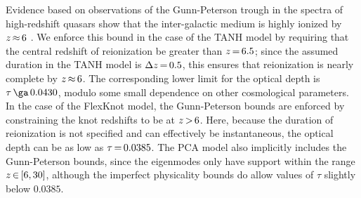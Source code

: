 \documentclass[longauth,traditabstract]{aa}
\def\,{\thinspace}
\begin{document}
Evidence based on observations of the Gunn-Peterson trough in the spectra of
high-redshift quasars show that  the inter-galactic medium is highly ionized by
$z\,{\approx}\,6$ \citep[see e.g.,][]{bouwens2015}. We enforce this bound in the
case of the TANH model by requiring that the central redshift of reionization be
greater than $z\,{=}\,6.5$; since the assumed duration in the TANH model is
$\Delta z\,{=}\,0.5$, this ensures that reionization is nearly complete by
$z\,{\approx}\,6$. The corresponding lower limit for the optical depth is
$\tau\,{\ga}\,0.0430$, modulo some small dependence on other cosmological
parameters. In the case of the FlexKnot model, the Gunn-Peterson bounds are
enforced by constraining the knot redshifts to be at $z\,{>}\,6$. Here, because the
duration of reionization is not specified and can effectively be instantaneous,
the optical depth can be as low as $\tau\,{=}\,0.0385$. The PCA model also
implicitly includes the Gunn-Peterson bounds, since the eigenmodes only have
support within the range $z\,{\in}\,[6,30]$, although the imperfect physicality bounds do
allow values of $\tau$ slightly below $0.0385$.
\end{document}
